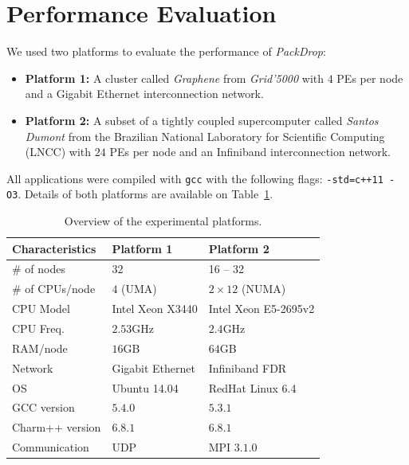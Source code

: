 \section{Performance Evaluation} \label{sec:eval}

We used two platforms to evaluate the performance of \textit{PackDrop}:

\begin{itemize}
	\item \textbf{Platform 1:} A cluster called \textit{Graphene} from \textit{Grid'5000} with $4$ PEs per node and  a Gigabit Ethernet interconnection network.
	\item \textbf{Platform 2:} A subset of a tightly coupled supercomputer called \textit{Santos Dumont} from the Brazilian National Laboratory for Scientific Computing (LNCC) with $24$ PEs per node and an Infiniband interconnection network.%
\end{itemize}

All applications were compiled with {\small\texttt{gcc}} with the following flags: {\small\texttt{-std=c++11 -O3}}. Details of both platforms are available on Table~\ref{tab:ptinfo}.

\begin{table}[t]
    \centering
    	\caption{Overview of the experimental platforms.}
	\begin{tabular}{lll}
	\toprule
	\textbf{Characteristics}	& \textbf{Platform 1} 		& \textbf{Platform 2}	\\
	\midrule
		\# of nodes	   		& 32 					& 16 -- 32 \\
        \# of CPUs/node	   	& $4$ (UMA) 				& $2\times12$ (NUMA) \\
        CPU Model			& Intel Xeon X3440 		& Intel Xeon E5-2695v2 \\
        CPU Freq.  			& $2.53$GHz				& $2.4$GHz \\
        RAM/node    			& $16$GB					& $64$GB	 \\
        Network 				& Gigabit Ethernet		& Infiniband FDR \\
        OS      				& Ubuntu 14.04			& RedHat Linux 6.4 \\
        GCC	version			& $5.4.0$				& $5.3.1$	\\
        Charm++ version		& $6.8.1$				& $6.8.1$ 	\\
        Communication		& UDP					& MPI $3.1.0$	\\
        \bottomrule
	\end{tabular}
    \label{tab:ptinfo}
\end{table}

